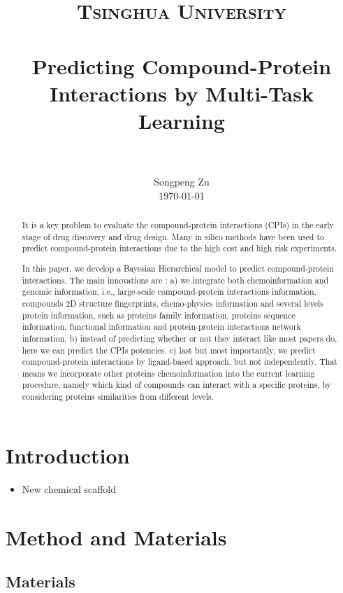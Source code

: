\documentclass[paper=a4, fontsize=11pt]{scrartcl}
\title{
		\usefont{OT1}{bch}{b}{n}
		\normalfont \normalsize \textsc{Tsinghua University} \\ [25pt]
		\horrule{0.5pt} \\[0.4cm]
		\huge Predicting Compound-Protein Interactions by Multi-Task Learning\\
		\horrule{2pt} \\[0.5cm]
}
\author{
		\normalfont 								\normalsize
        Songpeng Zu\\[-3pt]		\normalsize
        \today
}
\date{}
\numberwithin{equation}{section}		%
\numberwithin{figure}{section}			%
\numberwithin{table}{section}				%
\begin{document}
\maketitle
\begin{abstract}
It is a key problem to evaluate the compound-protein interactions (CPIs) in the early stage of drug discovery and drug design. Many in silico methods have been used to predict compound-protein interactions due to the high cost and high risk experiments.

In this paper, we develop a Bayesian Hierarchical model to predict compound-protein interactions. The main innovations are : a) we integrate both chemoinformation and genomic information, i.e., large-scale compound-protein interactions information, compounds 2D structure fingerprints, chemo-physics information and several levels protein information, such as proteins family information, proteins sequence information, functional information and protein-protein interactions network information. b) instead of predicting whether or not they interact like most papers do, here we can predict the CPIs potencies. c) last but most importantly, we predict compound-protein interactions by ligand-based approach, but not independently. That means we incorporate other proteins chemoinformation into the current learning procedure, namely which kind of compounds can interact with a specific proteins, by considering proteins similarities from different levels.

\end{abstract}
\newpage
\tableofcontents
\newpage
\section{Introduction}
\begin{itemize}
\item New chemical scaffold
\end{itemize}
\newpage
\section{Method and Materials}
\subsection{Materials}
\end{document}
